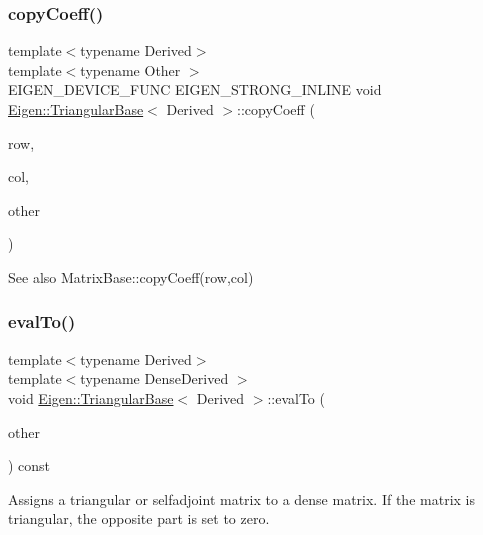 \subsubsection{\texorpdfstring{copyCoeff()}{copyCoeff()}}
{\footnotesize\ttfamily template$<$typename Derived$>$ \\
template$<$typename Other $>$ \\
E\+I\+G\+E\+N\+\_\+\+D\+E\+V\+I\+C\+E\+\_\+\+F\+U\+NC E\+I\+G\+E\+N\+\_\+\+S\+T\+R\+O\+N\+G\+\_\+\+I\+N\+L\+I\+NE void \mbox{\hyperlink{class_eigen_1_1_triangular_base}{Eigen\+::\+Triangular\+Base}}$<$ Derived $>$\+::copy\+Coeff (\begin{DoxyParamCaption}\item[{\mbox{\hyperlink{struct_eigen_1_1_eigen_base_a554f30542cc2316add4b1ea0a492ff02}{Index}}}]{row,  }\item[{\mbox{\hyperlink{struct_eigen_1_1_eigen_base_a554f30542cc2316add4b1ea0a492ff02}{Index}}}]{col,  }\item[{Other \&}]{other }\end{DoxyParamCaption})\hspace{0.3cm}{\ttfamily [inline]}}

\begin{DoxySeeAlso}{See also}
Matrix\+Base\+::copy\+Coeff(row,col) 
\end{DoxySeeAlso}
\mbox{\label{class_eigen_1_1_triangular_base_a604d4f76a376ced36f8b9c3374c76c3e}} 
\subsubsection{\texorpdfstring{evalTo()}{evalTo()}}
{\footnotesize\ttfamily template$<$typename Derived$>$ \\
template$<$typename Dense\+Derived $>$ \\
void \mbox{\hyperlink{class_eigen_1_1_triangular_base}{Eigen\+::\+Triangular\+Base}}$<$ Derived $>$\+::eval\+To (\begin{DoxyParamCaption}\item[{\mbox{\hyperlink{class_eigen_1_1_matrix_base}{Matrix\+Base}}$<$ Dense\+Derived $>$ \&}]{other }\end{DoxyParamCaption}) const}

Assigns a triangular or selfadjoint matrix to a dense matrix. If the matrix is triangular, the opposite part is set to zero. \mbox{\label{class_eigen_1_1_triangular_base_ab8db3e55eee50cdc56650b3498e235eb}} 
